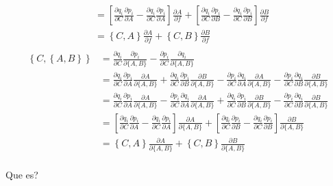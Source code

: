 \documentclass[a4paper]{article}
\begin{document}
\begin{answer}[punto 21]
\begin{align*}
            &= \left[\frac{\partial q_i}{\partial C} \frac{\partial p_i}{\partial A}  - \frac{\partial q_i}{\partial C} \frac{\partial p_i}{\partial A}\right] \frac{\partial A}{\partial f} + \left[\frac{\partial q_i}{\partial C} \frac{\partial p_i}{\partial B}  - \frac{\partial q_i}{\partial C} \frac{\partial p_i}{\partial B} \right]\frac{\partial B}{\partial f}\\
            &= \left\{C,A \right\} \frac{\partial A}{\partial f} + \left\{C,B \right\} \frac{\partial B}{\partial f}\\
        \end{align*}
        \begin{align*}
            \left\{C, \left\{A,B\right\}\right\} &= \frac{\partial q_i}{\partial C} \frac{\partial p_i}{\partial \{A,B\}} - \frac{\partial p_i}{\partial C} \frac{\partial q_i}{\partial \{A,B\}}\\
            &= \frac{\partial q_i}{\partial C} \frac{\partial p_i}{\partial A} \frac{\partial A}{\partial \{A,B\}} + \frac{\partial q_i}{\partial C} \frac{\partial p_i}{\partial B} \frac{\partial B}{\partial \{A,B\}} - \frac{\partial p_i}{\partial C} \frac{\partial q_i}{\partial A} \frac{\partial A}{\partial \{A,B\}} - \frac{\partial p_i}{\partial C} \frac{\partial q_i}{\partial B} \frac{\partial B}{\partial \{A,B\}}\\
            &= \frac{\partial q_i}{\partial C} \frac{\partial p_i}{\partial A} \frac{\partial A}{\partial \{A,B\}} - \frac{\partial p_i}{\partial C} \frac{\partial q_i}{\partial A} \frac{\partial A}{\partial \{A,B\}} + \frac{\partial q_i}{\partial C} \frac{\partial p_i}{\partial B} \frac{\partial B}{\partial \{A,B\}} - \frac{\partial p_i}{\partial C} \frac{\partial q_i}{\partial B} \frac{\partial B}{\partial \{A,B\}}\\
            &= \left[\frac{\partial q_i}{\partial C} \frac{\partial p_i}{\partial A}  - \frac{\partial q_i}{\partial C} \frac{\partial p_i}{\partial A}\right] \frac{\partial A}{\partial \{A,B\}} + \left[\frac{\partial q_i}{\partial C} \frac{\partial p_i}{\partial B}  - \frac{\partial q_i}{\partial C} \frac{\partial p_i}{\partial B} \right]\frac{\partial B}{\partial \{A,B\}}\\
            &= \left\{C,A \right\} \frac{\partial A}{\partial \{A,B\}} + \left\{C,B \right\} \frac{\partial B}{\partial \{A,B\}}\\
        \end{align*}

        Que es?


\end{answer}
\end{document}
